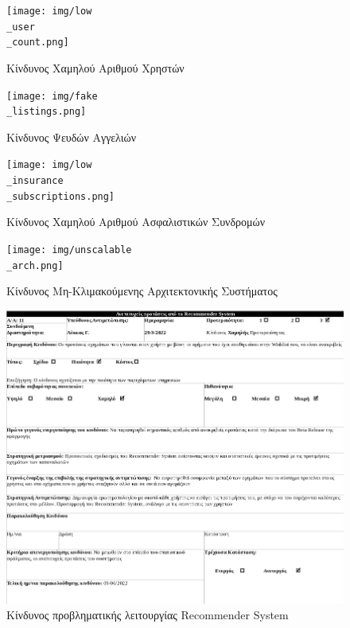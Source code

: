 \documentclass{../ol-softwaremanual}
\begin{document}
	\newpage
	
	\begin{figure}[htbp!]
		\texttt{[image: img/low\\\_user\\\_count.png]}
		\caption{Kίνδυνος Χαμηλού Αριθμού Χρηστών}
	\end{figure}
	
	\newpage
	\begin{figure}[htbp!]
		\texttt{[image: img/fake\\\_listings.png]}
		\caption{Kίνδυνος Ψευδών Αγγελιών}
	\end{figure}
	
	\newpage
	
	\begin{figure}[htbp!]
		\texttt{[image: img/low\\\_insurance\\\_subscriptions.png]}
		\caption{Kίνδυνος Χαμηλού Αριθμού Ασφαλιστικών Συνδρομών}
	\end{figure}
	
	\newpage
	
	\begin{figure}[htbp!]
		\texttt{[image: img/unscalable\\\_arch.png]}
		\caption{Κίνδυνος Μη-Κλιμακούμενης Αρχιτεκτονικής Συστήματος}
	\end{figure}
	
	\newpage
	
	\begin{figure}[htbp!]
		\includegraphics[scale=0.8]{img/rec_system_underfunction.png}
		\caption{Κίνδυνος προβληματικής λειτουργίας \en Recommender System \gr}
	\end{figure}
	
\end{document}
